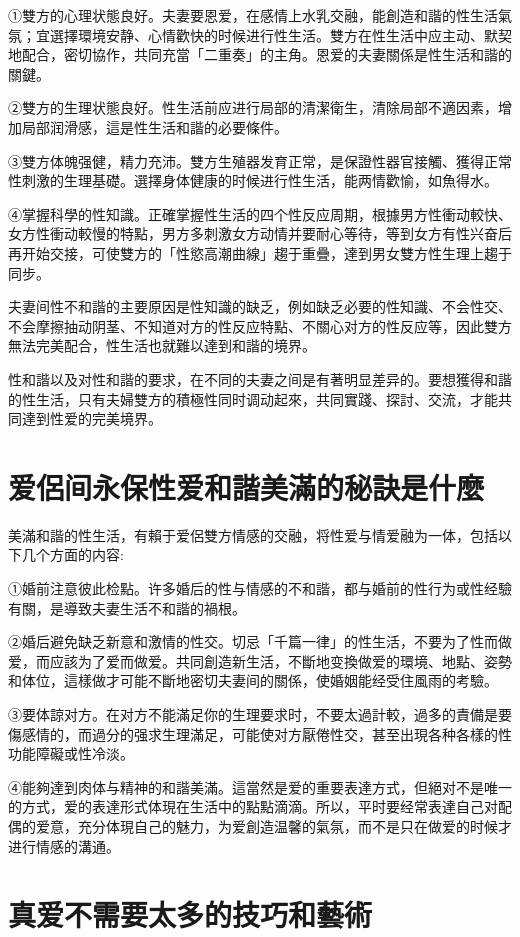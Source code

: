 \documentclass[12pt,UTF8]{ctexbook}
\begin{document}
①雙方的心理状態良好。夫妻要恩爱，在感情上水乳交融，能創造和諧的性生活氣氛；宜選擇環境安静、心情歡快的时候进行性生活。雙方在性生活中应主动、默契地配合，密切協作，共同充當「二重奏」的主角。恩爱的夫妻關係是性生活和諧的關鍵。

②雙方的生理状態良好。性生活前应进行局部的清潔衛生，清除局部不適因素，增加局部润滑感，這是性生活和諧的必要條件。

③雙方体魄强健，精力充沛。雙方生殖器发育正常，是保證性器官接觸、獲得正常性刺激的生理基礎。選擇身体健康的时候进行性生活，能两情歡愉，如魚得水。

④掌握科學的性知識。正確掌握性生活的四个性反应周期，根據男方性衝动較快、女方性衝动較慢的特點，男方多刺激女方动情并要耐心等待，等到女方有性兴奋后再开始交接，可使雙方的「性慾高潮曲線」趨于重疊，達到男女雙方性生理上趨于同步。

夫妻间性不和諧的主要原因是性知識的缺乏，例如缺乏必要的性知識、不会性交、不会摩擦抽动阴茎、不知道对方的性反应特點、不關心对方的性反应等，因此雙方無法完美配合，性生活也就難以達到和諧的境界。

性和諧以及对性和諧的要求，在不同的夫妻之间是有著明显差异的。要想獲得和諧的性生活，只有夫婦雙方的積極性同时调动起來，共同實踐、探討、交流，才能共同達到性爱的完美境界。

\section{爱侶间永保性爱和諧美滿的秘訣是什麼}

美滿和諧的性生活，有賴于爱侶雙方情感的交融，将性爱与情爱融为一体，包括以下几个方面的内容:

①婚前注意彼此检點。许多婚后的性与情感的不和諧，都与婚前的性行为或性经驗有關，是導致夫妻生活不和諧的禍根。

②婚后避免缺乏新意和激情的性交。切忌「千篇一律」的性生活，不要为了性而做爱，而应該为了爱而做爱。共同創造新生活，不斷地变換做爱的環境、地點、姿勢和体位，這樣做才可能不斷地密切夫妻间的關係，使婚姻能经受住風雨的考驗。

③要体諒对方。在对方不能滿足你的生理要求时，不要太過計較，過多的責備是要傷感情的，而過分的强求生理滿足，可能使对方厭倦性交，甚至出現各种各樣的性功能障礙或性冷淡。

④能夠達到肉体与精神的和諧美滿。這當然是爱的重要表達方式，但絕对不是唯一的方式，爱的表達形式体現在生活中的點點滴滴。所以，平时要经常表達自己对配偶的爱意，充分体現自己的魅力，为爱創造温馨的氣氛，而不是只在做爱的时候才进行情感的溝通。

\section{真爱不需要太多的技巧和藝術}
\end{document}

